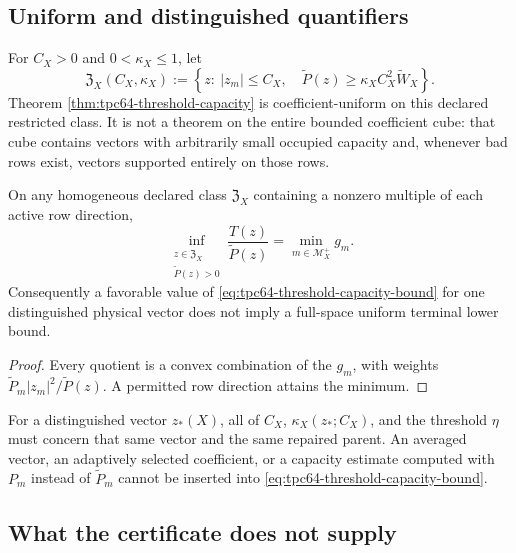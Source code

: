 \subsection{Uniform and distinguished quantifiers}

For \(C_X>0\) and \(0<\kappa_X\le1\), let
\begin{equation}
 \mathfrak Z_X(C_X,\kappa_X)
 :=
 \left\{
 z:\ |z_m|\le C_X,\quad
 \widetilde P(z)\ge
 \kappa_XC_X^2\widetilde W_X
 \right\}.
 \label{eq:tpc64-capacity-restricted-class}
\end{equation}
Theorem \ref{thm:tpc64-threshold-capacity} is coefficient-uniform on this
declared restricted class.  It is not a theorem on the entire bounded
coefficient cube: that cube contains vectors with arbitrarily small
occupied capacity and, whenever bad rows exist, vectors supported entirely
on those rows.

\begin{proposition}
\label{prop:tpc64-capacity-full-space-boundary}
On any homogeneous declared class \(\mathfrak Z_X\) containing a nonzero
multiple of each active row direction,
\begin{equation}
 \inf_{\substack{z\in\mathfrak Z_X\\\widetilde P(z)>0}}
 \frac{T(z)}{\widetilde P(z)}
 =\min_{m\in\mathcal M_X^+}g_m.
 \label{eq:tpc64-capacity-full-space-minimax}
\end{equation}
Consequently a favorable value of
\eqref{eq:tpc64-threshold-capacity-bound} for one distinguished physical
vector does not imply a full-space uniform terminal lower bound.
\end{proposition}

\begin{proof}
Every quotient is a convex combination of the \(g_m\), with weights
\(\widetilde P_m|z_m|^2/\widetilde P(z)\).  A permitted row direction
attains the minimum.
\end{proof}

For a distinguished vector \(z_*(X)\), all of
\(C_X\), \(\kappa_X(z_*;C_X)\), and the threshold \(\eta\) must concern
that same vector and the same repaired parent.  An averaged vector, an
adaptively selected coefficient, or a capacity estimate computed with
\(P_m\) instead of \(\widetilde P_m\) cannot be inserted into
\eqref{eq:tpc64-threshold-capacity-bound}.

\subsection{What the certificate does not supply}


